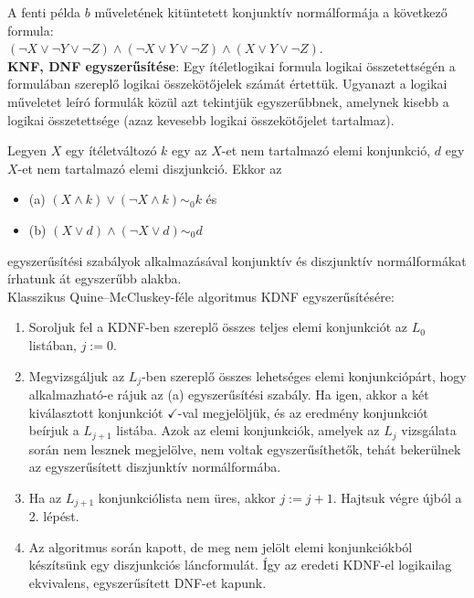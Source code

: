 \documentclass[margin=0px]{article}
\begin{document}
	A fenti példa $b$ műveletének kitüntetett konjunktív normálformája a következő formula:\\
	$(\neg X \vee \neg Y \vee \neg Z) \wedge (\neg X \vee Y \vee \neg Z) \wedge (X \vee Y \vee \neg Z)$. \\
	
	\noindent \textbf{KNF, DNF egyszerűsítése}: Egy ítéletlogikai formula logikai összetettségén a formulában szereplő
	logikai összekötőjelek számát értettük. Ugyanazt a logikai műveletet leíró formulák közül azt tekintjük egyszerűbbnek,
	amelynek kisebb a logikai összetettsége (azaz kevesebb logikai összekötőjelet tartalmaz).
	
	Legyen $X$ egy ítéletváltozó $k$ egy az $X$-et nem tartalmazó elemi konjunkció, $d$ egy $X$-et nem tartalmazó elemi
	diszjunkció. Ekkor az
	
	\begin{itemize}
		\item	(a) $(X \wedge k) \vee (\neg X \wedge k) \sim_{0} k $ és
		
		\item	(b) $(X \vee d) \wedge (\neg X \vee d) \sim_{0} d $
	\end{itemize}
	
	egyszerűsítési szabályok alkalmazásával konjunktív és diszjunktív normálformákat írhatunk át egyszerűbb alakba.\\
	
	\noindent Klasszikus Quine--McCluskey-féle algoritmus KDNF egyszerűsítésére:
	
	\begin{enumerate}
		\item	Soroljuk fel a KDNF-ben szereplő összes teljes elemi konjunkciót az $L_{0}$ listában, $j:=0$.
		
		\item	Megvizsgáljuk az $L_{j}$-ben szereplő összes lehetséges elemi konjunkciópárt, hogy alkalmazható-e
		rájuk az (a) egyszerűsítési szabály. Ha igen, akkor a két kiválasztott konjunkciót $\checkmark$-val megjelöljük,
		és az eredmény konjunkciót beírjuk a $L_{j+1}$ listába. Azok az elemi konjunkciók, amelyek az $L_{j}$ vizsgálata
		során nem lesznek megjelölve, nem voltak egyszerűsíthetők, tehát bekerülnek az egyszerűsített diszjunktív
		normálformába.
		
		\item	Ha az $L_{j+1}$ konjunkciólista nem üres, akkor $j:=j+1$. Hajtsuk végre újból a 2. lépést.
		
		\item	Az algoritmus során kapott, de meg nem jelölt elemi konjunkciókból készítsünk egy diszjunkciós
		láncformulát. Így az eredeti KDNF-el logikailag ekvivalens, egyszerűsített DNF-et kapunk.
	\end{enumerate}
	
\end{document}
